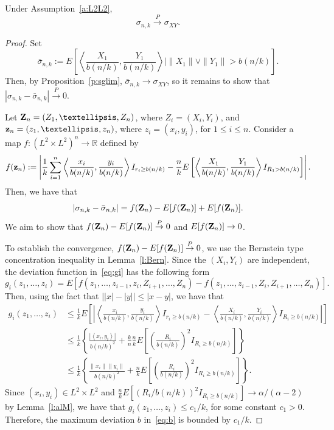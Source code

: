 \documentclass[10pt,a4paper]{amsart}
\def\convP{\stackrel{\mbox{$\scriptstyle P$}}{\rightarrow}}
\newcommand \ag{\alpha}
\newcommand \sg{\sigma}
\newcommand\bZ{{\bf Z}}
\newcommand\bz{{\bf z}}
\newcommand\lbr{\left \{}
\newcommand\lb{\left [}
\newcommand\lip{\left \langle}
\newcommand\lmo{\left |}
\newcommand\lp{\left (}
\newcommand\mbR{{\mathbb R}}
\newcommand\rbr{\right \}}
\newcommand\rb{\right ]}
\newcommand\rip{\right \rangle}
\newcommand\rmo{\right |}
\newcommand\rp{\right )}
\begin{document}
\begin{proposition} \label{p:bar}
Under Assumption~\ref{a:L2L2},
\[
\sg_{n,k} \convP \sg_{XY}.
\]
\end{proposition}

\begin{proof}

Set
\begin{equation} \label{eq:sgbar}
\bar{\sg}_{n,k} := E\lb \lip \frac{X_1}{b(n/k)}, \frac{Y_1}{b(n/k)} \rip \Bigg|\|X_1\| \vee \|Y_1\| >b(n/k)\rb.
\end{equation}
Then, by Proposition~\ref{p:sglim}, $\bar{\sg}_{n,k} \to \sg_{XY}$, so it remains to show that $|\sg_{n,k} - \bar{\sg}_{n,k}| \convP 0$.

Let $\bZ_n = (Z_1, \ldots, Z_n)$, where $Z_i = (X_i, Y_i)$, and $\bz_n = (z_1, \ldots, z_n)$, where $z_i = (x_i, y_i)$, for $1 \le i \le n$. Consider a map $f: (L^2 \times L^2)^n \to \mbR$ defined by
\[
f(\bz_n) := \lmo \frac{1}{k}\sum_{i=1}^n \lip \frac{x_i}{b(n/k)}, \frac{y_i}{b(n/k)} \rip I_{r_i \ge b(n/k) }- \frac{n}{k}E\lb \lip \frac{X_1}{b(n/k)}, \frac{Y_1}{b(n/k)} \rip I_{R_1 >b(n/k)}\rb \rmo.
\]
Then, we have that
\[
|\sg_{n,k} - \bar{\sg}_{n,k}| = f(\bZ_n) - E[f(\bZ_n)] + E[f(\bZ_n)].
\]
We aim to show that $f(\bZ_n) - E[f(\bZ_n)] \convP 0$ and $E[f(\bZ_n)] \to 0$.

To establish the convergence, $f(\bZ_n) - E[f(\bZ_n)] \convP 0$, we use the Bernstein type concentration inequality in Lemma~\ref{l:Bern}. Since the $(X_i,Y_i)$ are independent, the deviation function in~\eqref{eq:gi} has the following form
\[
g_i(z_1, \ldots, z_i)= E \lb f(z_1, \ldots, z_{i-1},z_i, Z_{i+1}, \ldots, Z_n)-f(z_1, \ldots, z_{i-1},Z_i, Z_{i+1}, \ldots, Z_n) \rb.
\]
Then, using the fact that $\lmo |x|- |y| \rmo \le |x-y|$, we have that
\begin{align*}
g_i(z_1, \ldots, z_i)
&\le \frac{1}{k} E\lb \lmo  \lip \frac{x_i}{b(n/k)}, \frac{y_i}{b(n/k)} \rip I_{r_i \ge b(n/k) } - \lip \frac{X_i}{b(n/k)}, \frac{Y_i}{b(n/k)} \rip I_{R_i \ge b(n/k) }       \rmo \rb \\
&\le \frac{1}{k} \lbr \frac{|\lip x_i, y_i\rip|}{b(n/k)^2} + \frac{k}{n} \frac{n}{k} E \lb \lp \frac{R_i}{b(n/k)} \rp^2 I_{R_i \ge b(n/k) }  \rb \rbr\\
&\le \frac{1}{k} \lbr \frac{\|x_i\| \| y_i\|}{b(n/k)^2} + \frac{n}{k} E \lb \lp \frac{R_i}{b(n/k)} \rp^2 I_{R_i \ge b(n/k) }  \rb \rbr.
\end{align*}
Since $(x_i,y_i) \in L^2\times L^2$ and $\frac{n}{k} E \lb \lp {R_i}/{b(n/k)} \rp^2 I_{R_i \ge b(n/k) }  \rb \to \ag/(\ag-2)$ by Lemma~\ref{l:alM},  we have that $g_{i}(z_1, \ldots, z_i) \le {c_1}/{k}$, for some constant $c_1>0$. Therefore, the maximum deviation $b$ in~\eqref{eq:b} is bounded by $c_1/k$.


\end{proof}
\end{document}
